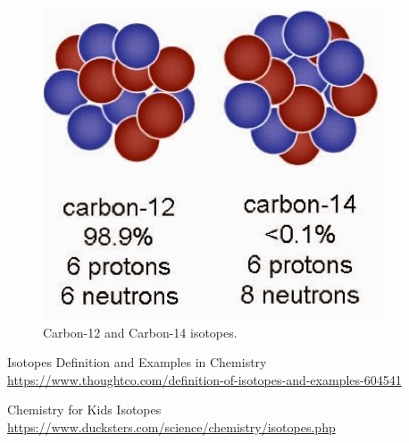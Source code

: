 \documentclass[letterpaper,12pt]{article}
\begin{document}
\begin{figure}[!htb] 
        \centering \includegraphics[width=0.3\columnwidth]{main}
        \caption{
                \label{fig:bottle} %
                Carbon-12 and Carbon-14 isotopes.
        }
\end{figure}



\begin{thebibliography}{99}

Isotopes Definition and Examples in Chemistry
    \href{https://www.thoughtco.com/definition-of-isotopes-and-examples-604541}{https://www.thoughtco.com/definition-of-isotopes-and-examples-604541}

Chemistry for Kids Isotopes
    \href{https://www.ducksters.com/science/chemistry/isotopes.php}{https://www.ducksters.com/science/chemistry/isotopes.php}

\end{thebibliography}
\end{document}
